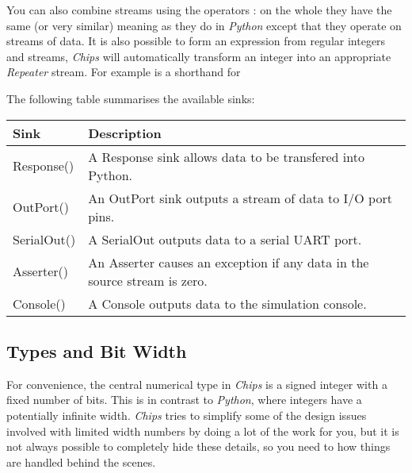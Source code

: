 \documentclass[letterpaper,10pt,english]{manual}
\begin{document}
You can also combine streams using the operators :  on the whole they have the same (or
very similar) meaning as they do in \emph{Python} except that they operate on streams
of data. It is also possible to form an expression from regular integers and
streams, \emph{Chips} will automatically transform an integer into an appropriate
\emph{Repeater} stream. For example  is a shorthand for

The following table summarises the available sinks:

\begin{tabulary}{\textwidth}{|L|L|}
\hline
\textbf{
Sink
} & \textbf{
Description
}\\
\hline

Response()
 & 
A Response sink allows data to be transfered into
Python.
\\

OutPort()
 & 
An OutPort sink outputs a stream of data to I/O port
pins.
\\

SerialOut()
 & 
A SerialOut outputs data to a serial UART port.
\\

Asserter()
 & 
An Asserter causes an exception if any data in the
source stream is zero.
\\

Console()
 & 
A Console outputs data to the simulation console.
\\
\hline
\end{tabulary}

\begin{quote}
\end{quote}


\subsection{Types and Bit Width}

For convenience, the central numerical type in \emph{Chips} is a signed integer with
a fixed number of bits.  This is in contrast to \emph{Python}, where integers have a
potentially infinite width. \emph{Chips} tries to simplify some of the design issues
involved with limited width numbers by doing a lot of the work for you, but it
is not always possible to completely hide these details, so you need to how
things are handled behind the scenes.
\end{document}
